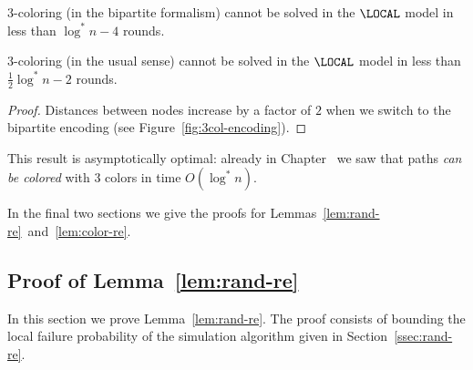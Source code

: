 \begin{theorem}
	3-coloring (in the bipartite formalism) cannot be solved in the $\LOCAL$ model in less than $\log^* n - 4$ rounds.
\end{theorem}

\begin{corollary}
	3-coloring (in the usual sense) cannot be solved in the $\LOCAL$ model in less than $\frac{1}{2} \log^* n - 2$ rounds.
\end{corollary}
\begin{proof}
	Distances between nodes increase by a factor of $2$ when we switch to the bipartite encoding (see Figure~\ref{fig:3col-encoding}).
\end{proof}

This result is asymptotically optimal: already in Chapter~ we saw that paths \emph{can be colored} with 3 colors in time $O(\log^* n)$.

In the final two sections we give the proofs for Lemmas~\ref{lem:rand-re}~and~\ref{lem:color-re}.

\subsection{Proof of Lemma~\ref{lem:rand-re}} \label{ssec:rand-re-proof}

In this section we prove Lemma~\ref{lem:rand-re}. The proof consists of bounding the local failure probability of the simulation algorithm given in Section~\ref{ssec:rand-re}.

